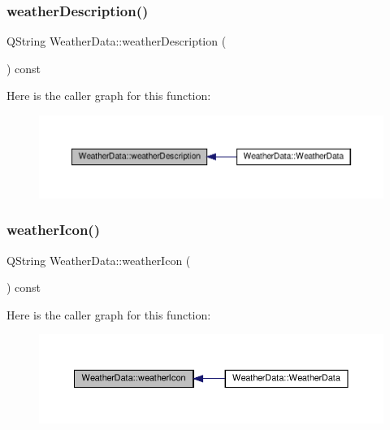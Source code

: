 \subsubsection{\texorpdfstring{weather\+Description()}{weatherDescription()}}
{\footnotesize\ttfamily Q\+String Weather\+Data\+::weather\+Description (\begin{DoxyParamCaption}{ }\end{DoxyParamCaption}) const}

Here is the caller graph for this function\+:\nopagebreak
\begin{figure}[H]
\begin{center}
\leavevmode
\includegraphics[width=350pt]{class_weather_data_a63a3528697c8681bd32d4d170ec91f76_icgraph}
\end{center}
\end{figure}
\mbox{\label{class_weather_data_a5baf2d9cc08741d7af4a07d61df95ee4}} 
\subsubsection{\texorpdfstring{weather\+Icon()}{weatherIcon()}}
{\footnotesize\ttfamily Q\+String Weather\+Data\+::weather\+Icon (\begin{DoxyParamCaption}{ }\end{DoxyParamCaption}) const}

Here is the caller graph for this function\+:\nopagebreak
\begin{figure}[H]
\begin{center}
\leavevmode
\includegraphics[width=350pt]{class_weather_data_a5baf2d9cc08741d7af4a07d61df95ee4_icgraph}
\end{center}
\end{figure}
\mbox{\label{class_weather_data_a04b09d8065d64b62f1ad679b4493fc62}} 
